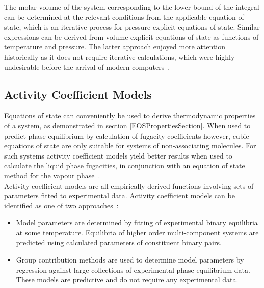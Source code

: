 
The molar volume of the system corresponding to the lower bound of the integral can be determined at the relevant conditions from the applicable equation of state, which is an iterative process for pressure explicit equations of state. Similar expressions can be derived from volume explicit equations of state as functions of temperature and pressure. The latter approach enjoyed more attention historically as it does not require iterative calculations, which were highly undesirable before the arrival of modern computers~\cite{MolecularThermodynamicsOfFluidPhaseEquilibria, ThermodynamicModels}.\

\subsection{Activity Coefficient Models}

Equations of state can conveniently be used to derive thermodynamic properties of a system, as demonstrated in section \ref{EOSPropertiesSection}. When used to predict phase-equilibrium by calculation of fugacity coefficients however, cubic equations of state are only suitable for systems of non-associating molecules. For such systems activity coefficient models yield better results when used to calculate the liquid phase fugacities, in conjunction with an equation of state method for the vapour phase~\cite{ThermophysicalProperties, ThermodynamicPropertiesGibbsModels, LLECalculation, ActivityCoefficientModelApplicationNRTL}.\\

Activity coefficient models are all empirically derived functions involving sets of parameters fitted to experimental data. Activity coefficient models can be identified as one of two approaches~\cite{ThermophysicalProperties, ThermodynamicModels, LocalCompositionModels}:\
\begin{itemize}
\item Model parameters are determined by fitting of experimental binary equilibria at some temperature. Equilibria of higher order multi-component systems are predicted using calculated parameters of constituent binary pairs.\
\item Group contribution methods are used to determine model parameters by regression against large collections of experimental phase equilibrium data. These models are predictive and do not require any experimental data.\
\end{itemize}

